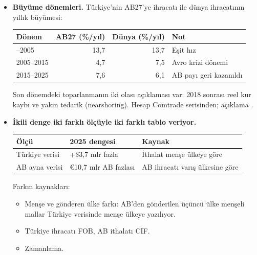\begin{itemize}
\item
  \textbf{Büyüme dönemleri.} Türkiye'nin AB27'ye ihracatı ile dünya ihracatının yıllık büyümesi:

  \begingroup\gbtablo\small

  \begin{longtable}[]{@{}lrrl@{}}
  \toprule\noalign{}
  \textbf{Dönem} & \textbf{AB27 (\%/yıl)} & \textbf{Dünya (\%/yıl)} & \textbf{Not} \\
  \midrule\noalign{}
  \endhead
  \bottomrule\noalign{}
  \endlastfoot
  1996--2005 & 13,7 & 13,7 & Eşit hız \\
  2005--2015 & 4,7 & 7,5 & Avro krizi dönemi \\
  2015--2025 & 7,6 & 6,1 & AB payı geri kazanıldı \\
  \end{longtable}

  \endgroup

  Son dönemdeki toparlanmanın iki olası açıklaması var: 2018 sonrası reel kur kaybı ve yakın tedarik (nearshoring). \etiketV{} Hesap Comtrade serisinden; açıklama \etiketH{}.
\item
  \textbf{İkili denge iki farklı ölçüyle iki farklı tablo veriyor.}

  \begingroup\gbtablo\small

  \begin{longtable}[]{@{}lll@{}}
  \toprule\noalign{}
  \textbf{Ölçü} & \textbf{2025 dengesi} & \textbf{Kaynak} \\
  \midrule\noalign{}
  \endhead
  \bottomrule\noalign{}
  \endlastfoot
  Türkiye verisi & +\$3,7 mlr fazla & İthalat menşe ülkeye göre \\
  AB ayna verisi & €10,7 mlr AB fazlası & AB ihracatı varış ülkesine göre \\
  \end{longtable}

  \endgroup

  Farkın kaynakları:

  \begin{itemize}
  \tightlist
  \item
    Menşe ve gönderen ülke farkı: AB'den gönderilen üçüncü ülke menşeli mallar Türkiye verisinde menşe ülkeye yazılıyor.
  \item
    Türkiye ihracatı FOB, AB ithalatı CIF.
  \item
    Zamanlama.
  \end{itemize}


\end{itemize}
